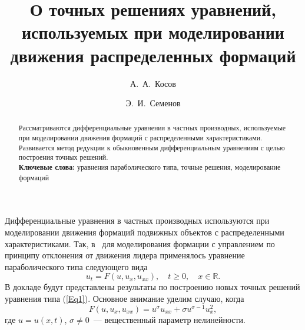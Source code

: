 \usepackage{todonotes} %

\usepackage[russian]{nla}



%
\fi

\title{О точных решениях уравнений, используемых при моделировании движения распределенных формаций}
\author{А.~А.~Косов   %
  \and  %
  Э.~И.~Семенов 
} %


\maketitle

\begin{abstract}
Рассматриваются дифференциальные уравнения в частных производных, используемые при моделировании движения формаций с распределенными характеристиками. Развивается метод редукции к обыкновенным дифференциальным уравнениям с целью построения точных решений.\\
{{\bf Ключевые слова:} уравнения параболического типа, точные решения, моделирование формаций} %
\end{abstract}

Дифференциальные уравнения в частных производных используются при моделировании движения формаций подвижных объектов с распределенными характеристиками. Так, в~\cite{wfj} для моделирования формации с управлением по принципу отклонения от движения лидера применялось уравнение параболического типа следующего вида
\begin{equation}\label{Eq1}
u_t=F\left(u,u_{x},u_{xx}\right),\quad t\geq 0,\quad x\in\mathbb{R}. 
\end{equation}
В докладе будут представлены результаты по построению новых точных решений уравнения типа (\ref{Eq1}). Основное внимание уделим случаю, когда 
$$
F\left(u,u_{x},u_{xx}\right)=u^{\sigma}u_{xx}+\sigma u^{\sigma-1}u_{x}^2,
$$
где $u=u(x,t)$, $\sigma\ne 0$~--- вещественный параметр нелинейности.

